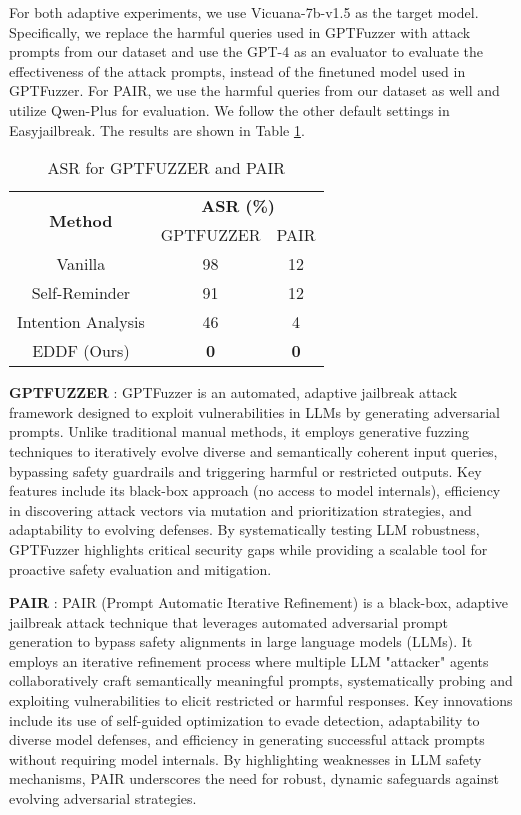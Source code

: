 For both adaptive experiments, we use Vicuana-7b-v1.5 as the target model. Specifically, we replace the harmful queries used in GPTFuzzer with attack prompts from our dataset and use the GPT-4 as an evaluator to evaluate the effectiveness of the attack prompts, instead of the finetuned model used in GPTFuzzer. For PAIR, we use the harmful queries from our dataset as well and utilize Qwen-Plus for evaluation. We follow the other default settings in Easyjailbreak. The results are shown in Table \ref{gptfuzzer}. 

\begin{table}[h]
    \centering
    \small
    \begin{tabular}{ccc}
    \hline
    \multirow{2}{*}{\textbf{Method}} & \multicolumn{2}{c}{\textbf{ASR (\%)}} \\ \cline{2-3} 
     & GPTFUZZER & PAIR \\ \hline
    Vanilla & 98 & 12 \\
    Self-Reminder & 91 & 12 \\
    Intention Analysis & 46 & 4 \\
    EDDF (Ours) & \textbf{0} & \textbf{0} \\ \hline
    \end{tabular}
    \caption{ASR for GPTFUZZER and PAIR}
    \label{gptfuzzer}
\end{table}

\textbf{GPTFUZZER} \citep{yu2023gptfuzzer}:
GPTFuzzer is an automated, adaptive jailbreak attack framework designed to exploit 
vulnerabilities in LLMs by generating adversarial prompts. Unlike traditional manual methods, it employs generative fuzzing techniques to iteratively evolve diverse and semantically coherent input queries, bypassing safety guardrails and triggering harmful or restricted outputs. Key features include its black-box approach (no access to model internals), efficiency in discovering attack vectors via mutation and prioritization strategies, and adaptability to evolving defenses. By systematically testing LLM robustness, GPTFuzzer highlights critical security gaps while providing a scalable tool for proactive safety evaluation and mitigation.

\textbf{PAIR} \citep{chao2023jailbreaking}:
PAIR (Prompt Automatic Iterative Refinement) is a black-box, adaptive jailbreak attack technique that leverages automated adversarial prompt generation to bypass safety alignments in large language models (LLMs). It employs an iterative refinement process where multiple LLM "attacker" agents collaboratively craft semantically meaningful prompts, systematically probing and exploiting vulnerabilities to elicit restricted or harmful responses. Key innovations include its use of self-guided optimization to evade detection, adaptability to diverse model defenses, and efficiency in generating successful attack prompts without requiring model internals. By highlighting weaknesses in LLM safety mechanisms, PAIR underscores the need for robust, dynamic safeguards against evolving adversarial strategies.

